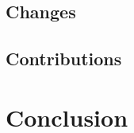 \documentclass[a4paper]{article}
\begin{document}
\subsection{Changes}
\subsection{Contributions}
\section{Conclusion}
\end{document}

